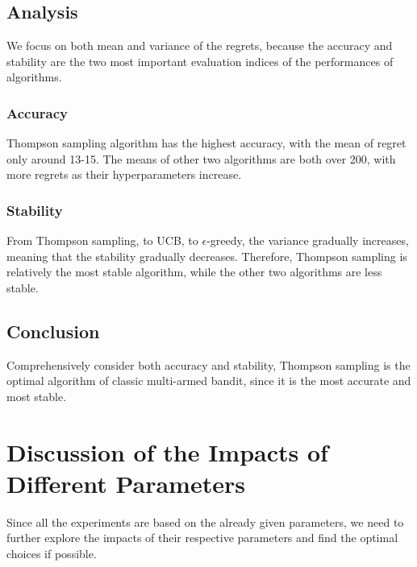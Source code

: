\documentclass[11pt]{article}
\begin{document}
    \hypertarget{analysis}{%
\subsection{Analysis}\label{analysis}}

We focus on both mean and variance of the regrets, because the accuracy
and stability are the two most important evaluation indices of the
performances of algorithms.

    \hypertarget{accuracy}{%
\subsubsection{Accuracy}\label{accuracy}}

Thompson sampling algorithm has the highest accuracy, with the mean of
regret only around 13-15. The means of other two algorithms are both
over 200, with more regrets as their hyperparameters increase.

    \hypertarget{stability}{%
\subsubsection{Stability}\label{stability}}

From Thompson sampling, to UCB, to \(\epsilon\)-greedy, the variance
gradually increases, meaning that the stability gradually decreases.
Therefore, Thompson sampling is relatively the most stable algorithm,
while the other two algorithms are less stable.

    \hypertarget{conclusion}{%
\subsection{Conclusion}\label{conclusion}}

Comprehensively consider both accuracy and stability, Thompson sampling
is the optimal algorithm of classic multi-armed bandit, since it is the
most accurate and most stable.

    \hypertarget{discussion-of-the-impacts-of-different-parameters}{%
\section{Discussion of the Impacts of Different
Parameters}\label{discussion-of-the-impacts-of-different-parameters}}

    Since all the experiments are based on the already given parameters, we
need to further explore the impacts of their respective parameters and
find the optimal choices if possible.
\end{document}
